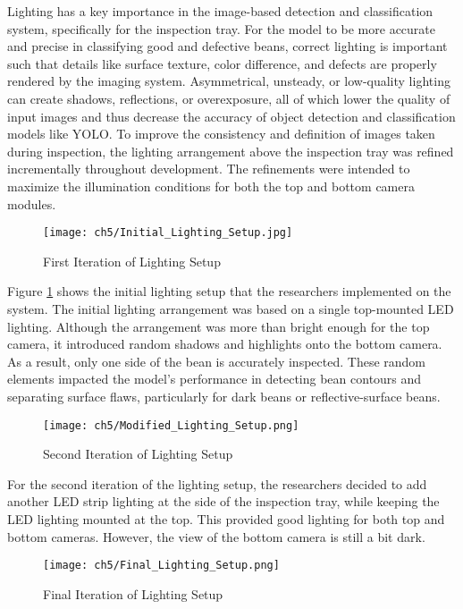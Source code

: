 Lighting has a key importance in the image-based detection and classification system, specifically for the inspection tray. For the model to be more accurate and precise in classifying good and defective beans, correct lighting is important such that details like surface texture, color difference, and defects are properly rendered by the imaging system. Asymmetrical, unsteady, or low-quality lighting can create shadows, reflections, or overexposure, all of which lower the quality of input images and thus decrease the accuracy of object detection and classification models like YOLO. To improve the consistency and definition of images taken during inspection, the lighting arrangement above the inspection tray was refined incrementally throughout development. The refinements were intended to maximize the illumination conditions for both the top and bottom camera modules.


\begin{figure}[H]
    \centering
    \texttt{[image: ch5/Initial\_Lighting\_Setup.jpg]}
    \caption{First Iteration of Lighting Setup}
    \label{fig:first_lighting}
\end{figure}

Figure \ref{fig:first_lighting} shows the initial lighting setup that the researchers implemented on the system. The initial lighting arrangement was based on a single top-mounted LED lighting. Although the arrangement was more than bright enough for the top camera, it introduced random shadows and highlights onto the bottom camera. As a result, only one side of the bean is accurately inspected. These random elements impacted the model's performance in detecting bean contours and separating surface flaws, particularly for dark beans or reflective-surface beans.


\begin{figure}[H]
    \centering
    \texttt{[image: ch5/Modified\_Lighting\_Setup.png]}
    \caption{Second Iteration of Lighting Setup}
    \label{fig:second_lighting}
\end{figure}

For the second iteration of the lighting setup, the researchers decided to add another LED strip lighting at the side of the inspection tray, while keeping the LED lighting mounted at the top. This provided good lighting for both top and bottom cameras. However, the view of the bottom camera is still a bit dark.


\begin{figure}[H]
    \centering
    \texttt{[image: ch5/Final\_Lighting\_Setup.png]}
    \caption{Final Iteration of Lighting Setup}
    \label{fig:final_lighting}
\end{figure}

